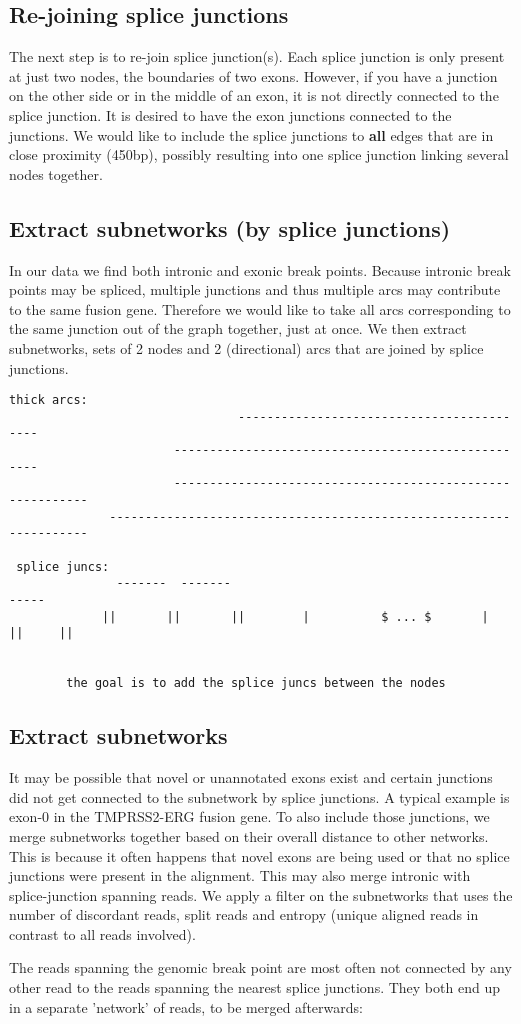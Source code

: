 \documentclass{article}
\theoremstyle{definition}
\begin{document}
\subsection{Re-joining splice junctions}
The next step is to re-join splice junction(s).
Each splice junction is only present at just two nodes, the boundaries of two exons.
However, if you have a junction on the other side or in the middle of an exon, it is not directly connected to the splice junction.
It is desired to have the exon junctions connected to the junctions.
We would like to include the splice junctions to \textbf{all} edges that are in close proximity (450bp), possibly resulting into one splice junction linking several nodes together.

\subsection{Extract subnetworks (by splice junctions)}
In our data we find both intronic and exonic break points.
Because intronic break points may be spliced, multiple junctions and thus multiple arcs may contribute to the same fusion gene.
Therefore we would like to take all arcs corresponding to the same junction out of the graph together, just at once.
We then extract subnetworks, sets of 2 nodes and 2 (directional) arcs that are joined by splice junctions.

\begin{verbatim}
thick arcs:
                                ------------------------------------------
                       ---------------------------------------------------
                       ----------------------------------------------------------
              -------------------------------------------------------------------

 splice juncs:
               -------  -------                                            -----
             ||       ||       ||        |          $ ... $       |      ||     ||

        
        the goal is to add the splice juncs between the nodes
\end{verbatim}



\subsection{Extract subnetworks}
It may be possible that novel or unannotated exons exist and certain junctions did not get connected to the subnetwork by splice junctions.
A typical example is exon-0 in the TMPRSS2-ERG fusion gene.
To also include those junctions, we merge subnetworks together based on their overall distance to other networks.
This is because it often happens that novel exons are being used or that no splice junctions were present in the alignment.
This may also merge intronic with splice-junction spanning reads.
We apply a filter on the subnetworks that uses the number of discordant reads, split reads and entropy (unique aligned reads in contrast to all reads involved).

The reads spanning the genomic break point are most often not connected by any other read to the reads spanning the nearest splice junctions.
They both end up in a separate 'network' of reads, to be merged afterwards:
\end{document}
